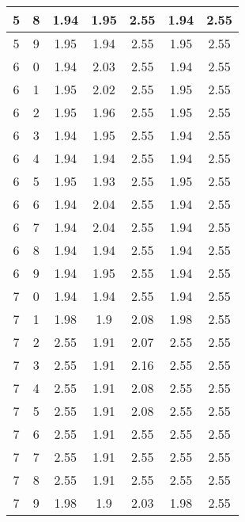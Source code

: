 \begin{longtable}{|c|c||c||c|c||c|c|}
	5 & 8 & 1.94 & 1.95 & 2.55 & 1.94 & 2.55 \\ \hline
	5 & 9 & 1.95 & 1.94 & 2.55 & 1.95 & 2.55 \\ \hline
	6 & 0 & 1.94 & 2.03 & 2.55 & 1.94 & 2.55 \\ \hline
	6 & 1 & 1.95 & 2.02 & 2.55 & 1.95 & 2.55 \\ \hline
	6 & 2 & 1.95 & 1.96 & 2.55 & 1.95 & 2.55 \\ \hline
	6 & 3 & 1.94 & 1.95 & 2.55 & 1.94 & 2.55 \\ \hline
	6 & 4 & 1.94 & 1.94 & 2.55 & 1.94 & 2.55 \\ \hline
	6 & 5 & 1.95 & 1.93 & 2.55 & 1.95 & 2.55 \\ \hline
	6 & 6 & 1.94 & 2.04 & 2.55 & 1.94 & 2.55 \\ \hline
	6 & 7 & 1.94 & 2.04 & 2.55 & 1.94 & 2.55 \\ \hline
	6 & 8 & 1.94 & 1.94 & 2.55 & 1.94 & 2.55 \\ \hline
	6 & 9 & 1.94 & 1.95 & 2.55 & 1.94 & 2.55 \\ \hline
	7 & 0 & 1.94 & 1.94 & 2.55 & 1.94 & 2.55 \\ \hline
	7 & 1 & 1.98 & 1.9 & 2.08 & 1.98 & 2.55 \\ \hline
	7 & 2 & 2.55 & 1.91 & 2.07 & 2.55 & 2.55 \\ \hline
	7 & 3 & 2.55 & 1.91 & 2.16 & 2.55 & 2.55 \\ \hline
	7 & 4 & 2.55 & 1.91 & 2.08 & 2.55 & 2.55 \\ \hline
	7 & 5 & 2.55 & 1.91 & 2.08 & 2.55 & 2.55 \\ \hline
	7 & 6 & 2.55 & 1.91 & 2.55 & 2.55 & 2.55 \\ \hline
	7 & 7 & 2.55 & 1.91 & 2.55 & 2.55 & 2.55 \\ \hline
	7 & 8 & 2.55 & 1.91 & 2.55 & 2.55 & 2.55 \\ \hline
	7 & 9 & 1.98 & 1.9 & 2.03 & 1.98 & 2.55 \\ \hline
\end{longtable}
\clearpage{}
